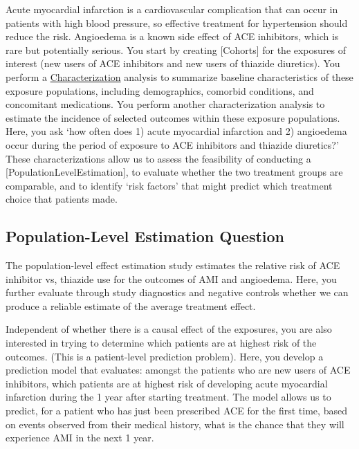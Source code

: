 \documentclass[11pt]{book}
\theoremstyle{definition}
\theoremstyle{definition}
\theoremstyle{definition}
\theoremstyle{remark}
\begin{document}
Acute myocardial infarction is a cardiovascular complication that can occur in patients with high blood pressure, so effective treatment for hypertension should reduce the risk. Angioedema is a known side effect of ACE inhibitors, which is rare but potentially serious. You start by creating {[}Cohorts{]} for the exposures of interest (new users of ACE inhibitors and new users of thiazide diuretics). You perform a \protect\hyperlink{Characterization}{Characterization} analysis to summarize baseline characteristics of these exposure populations, including demographics, comorbid conditions, and concomitant medications. You perform another characterization analysis to estimate the incidence of selected outcomes within these exposure populations. Here, you ask `how often does 1) acute myocardial infarction and 2) angioedema occur during the period of exposure to ACE inhibitors and thiazide diuretics?' These characterizations allow us to assess the feasibility of conducting a {[}PopulationLevelEstimation{]}, to evaluate whether the two treatment groups are comparable, and to identify `risk factors' that might predict which treatment choice that patients made.

\hypertarget{population-level-estimation-question}{%
\subsection{Population-Level Estimation Question}\label{population-level-estimation-question}}

The population-level effect estimation study estimates the relative risk of ACE inhibitor vs, thiazide use for the outcomes of AMI and angioedema. Here, you further evaluate through study diagnostics and negative controls whether we can produce a reliable estimate of the average treatment effect.

Independent of whether there is a causal effect of the exposures, you are also interested in trying to determine which patients are at highest risk of the outcomes. (This is a patient-level prediction problem). Here, you develop a prediction model that evaluates: amongst the patients who are new users of ACE inhibitors, which patients are at highest risk of developing acute myocardial infarction during the 1 year after starting treatment. The model allows us to predict, for a patient who has just been prescribed ACE for the first time, based on events observed from their medical history, what is the chance that they will experience AMI in the next 1 year.
\end{document}
